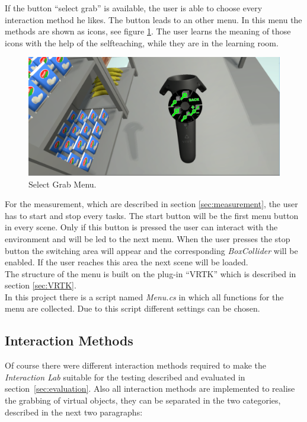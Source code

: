 If the button ``select grab'' is available, the user is able to choose every interaction method he likes. The button leads to an other menu. In this menu the methods are shown as icons, see figure \ref{fig:grabMenu}. The user learns the meaning of those icons with the help of the selfteaching, while they are in the learning room. 

\begin{figure}[H] 
	\center 
	\includegraphics[width=12cm]{Images/Menu2.PNG}
	\caption[Select Grab Menu.]{Select Grab Menu.}
	\label{fig:grabMenu}
\end{figure}

For the measurement, which are described in section \ref{sec:measurement}, the user has to start and stop every tasks. The start button will be the first menu button in every scene. Only if this button is pressed the user can interact with the environment and will be led to the next menu. When the user presses the stop button the switching area will appear and the corresponding \textit{BoxCollider} \cite{website:BoxCollider} will be enabled. If the user reaches this area the next scene will be loaded.\\
The structure of the menu is built on the plug-in ``VRTK'' which is described in section \ref{sec:VRTK}.\\
In this project there is a script named \textit{Menu.cs} in which all functions for the menu are collected. Due to this script different settings can be chosen.


\subsection{Interaction Methods}\label{sec:Interactions}
Of course there were different interaction methods required to make the \textit{Interaction Lab} suitable for the testing described and evaluated in section~\ref{sec:evaluation}. Also all interaction methods are implemented to realise the grabbing of virtual objects, they can be separated in the two categories, described in the next two paragraphs:

